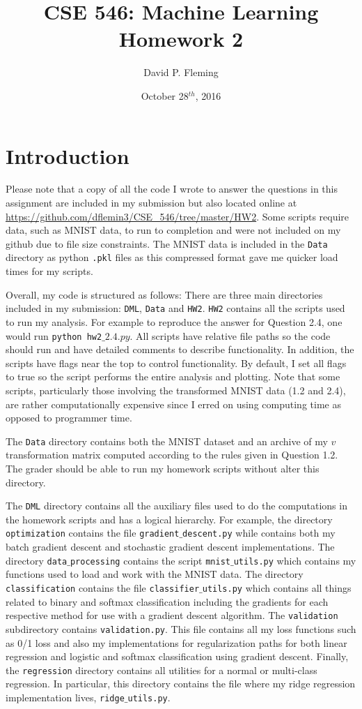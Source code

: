 \documentclass[12pt]{amsart}
\title{CSE 546: Machine Learning Homework 2}
\author{David P. Fleming}
\date{October 28$^{th}$, 2016}
\begin{document}
\maketitle
\tableofcontents

\section*{Introduction}

Please note that a copy of all the code I wrote to answer the questions in this assignment are included in my submission but also located online at \url{https://github.com/dflemin3/CSE_546/tree/master/HW2}.  Some scripts require data, such as MNIST data, to run to completion and were not included on my github due to file size constraints.  The MNIST data is included in the {\tt Data} directory as python {\tt .pkl} files as this compressed format gave me quicker load times for my scripts.

Overall, my code is structured as follows:  There are three main directories included in my submission: {\tt DML}, {\tt Data} and {\tt HW2}. {\tt HW2} contains all the scripts used to run my analysis.  For example to reproduce the answer for Question 2.4, one would run {\tt python hw2$\_2.4.py$}.  All scripts have relative file paths so the code should run and have detailed comments to describe functionality.  In addition, the scripts have flags near the top to control functionality.  By default, I set all flags to true so the script performs the entire analysis and plotting.  Note that some scripts, particularly those involving the transformed MNIST data (1.2 and 2.4), are rather computationally expensive since I erred on using computing time as opposed to programmer time.

The {\tt Data} directory contains both the MNIST dataset and an archive of my $v$ transformation matrix computed according to the rules given in Question 1.2.  The grader should be able to run my homework scripts without alter this directory.  

The {\tt DML} directory contains all the auxiliary files used to do the computations in the homework scripts and has a logical hierarchy.  For example, the directory {\tt optimization} contains the file {\tt gradient$\_$descent.py} while contains both my batch gradient descent and stochastic gradient descent implementations.  The directory {\tt data$\_$processing} contains the script {\tt mnist$\_$utils.py} which contains my functions used to load and work with the MNIST data.  The directory {\tt classification} contains the file {\tt classifier$\_$utils.py} which contains all things related to binary and softmax classification including the gradients for each respective method for use with a gradient descent algorithm.  The {\tt validation} subdirectory contains {\tt validation.py}.  This file contains all my loss functions such as 0/1 loss and also my implementations for regularization paths for both linear regression and logistic and softmax classification using gradient descent.  Finally, the {\tt regression} directory contains all utilities for a normal or multi-class regression.  In particular, this directory contains the file where my ridge regression implementation lives, {\tt ridge$\_$utils.py}. 
\end{document}
